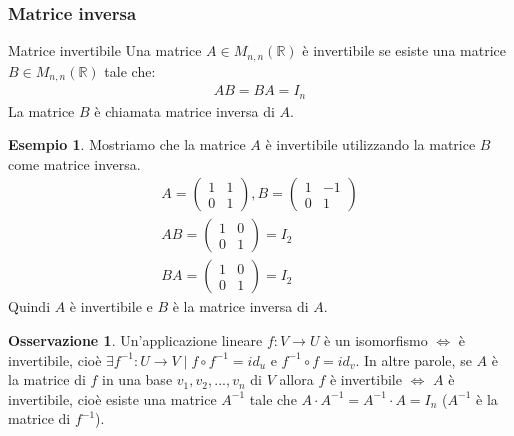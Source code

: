 \documentclass[a4paper]{article}
\theoremstyle{definition}
\newtheorem*{oss}{Osservazione}
\newtheorem*{es}{Esempio}
\begin{document}
\subsubsection{Matrice inversa}
\begin{deff}{Matrice invertibile}{}
	Una matrice $A \in M_{n, n}(\mathbb{R})$ è invertibile se esiste una matrice $B \in M_{n, n}(\mathbb{R})$ tale che:
	\begin{align*}
		AB = BA = I_n
	\end{align*}
	La matrice $B$ è chiamata matrice inversa di $A$.
\end{deff}
\begin{es}
	Mostriamo che la matrice $A$ è invertibile utilizzando la matrice $B$ come matrice inversa.
	\begin{align*}
		A = \begin{pmatrix}
			1 & 1 \\
			0 & 1
			\end{pmatrix}, B = \begin{pmatrix}
			1 & -1 \\
			0 & 1
			\end{pmatrix} \\
		AB = \begin{pmatrix}
			1 & 0 \\
			0 & 1
		\end{pmatrix} = I_2 \\
		BA = \begin{pmatrix}
			1 & 0 \\
			0 & 1
		\end{pmatrix} = I_2
	\end{align*}
	Quindi $A$ è invertibile e $B$ è la matrice inversa di $A$.
\end{es}
\begin{oss}
	Un'applicazione lineare $f: V \rightarrow U$ è un isomorfismo $\Leftrightarrow$ è invertibile,
	cioè $\exists f^{-1}: U \rightarrow V \mid f \circ f^{-1} = id_u$ e $f^{-1} \circ f = id_v$.
	In altre parole, se $A$ è la matrice di $f$ in una base $v_1, v_2, ..., v_n$ di $V$ allora $f$ è invertibile $\Leftrightarrow$ $A$ è invertibile,
	cioè esiste una matrice $A^{-1}$ tale che $A \cdot A^{-1} = A^{-1} \cdot A = I_n$ ($A^{-1}$ è la matrice di $f^{-1}$).
\end{oss}
\end{document}
